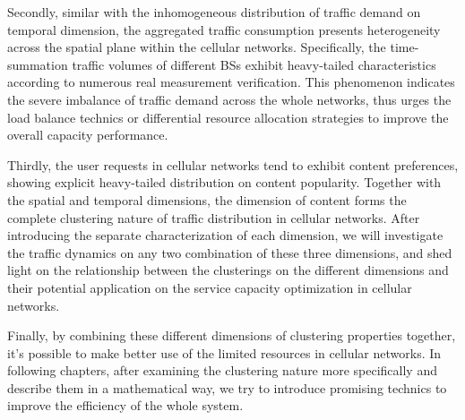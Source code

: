 Secondly, similar with the inhomogeneous distribution of traffic demand on temporal dimension, the aggregated traffic consumption presents heterogeneity across the spatial plane within the cellular networks. Specifically, the time-summation traffic volumes of different BSs exhibit heavy-tailed characteristics according to numerous real measurement verification. This phenomenon indicates the severe imbalance of traffic demand across the whole networks, thus urges the load balance technics or differential resource allocation strategies to improve the overall capacity performance.

Thirdly, the user requests in cellular networks tend to exhibit content preferences, showing explicit heavy-tailed distribution on content popularity. Together with the spatial and temporal dimensions, the dimension of content forms the complete clustering nature of traffic distribution in cellular networks. After introducing the separate characterization of each dimension, we will investigate the traffic dynamics on any two combination of these three dimensions, and shed light on the relationship between the clusterings on the different dimensions and their potential application on the service capacity optimization in cellular networks.

Finally, by combining these different dimensions of clustering properties together, it's possible to make better use of the limited resources in cellular networks. In following chapters, after examining the clustering nature more specifically and describe them in a mathematical way, we try to introduce promising technics to improve the efficiency of the whole system.
